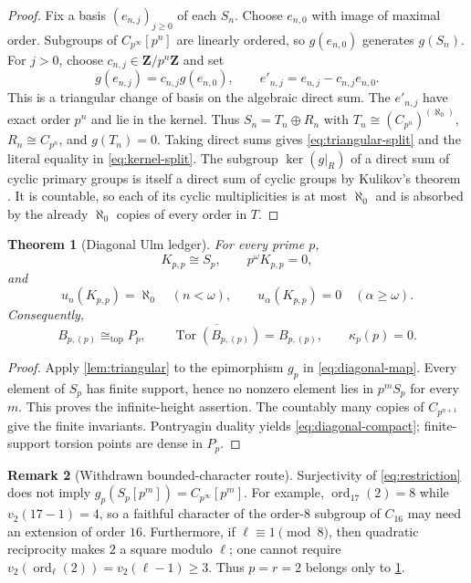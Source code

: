 \documentclass[11pt]{article}
\newtheorem{theorem}{Theorem}[section]
\theoremstyle{definition}
\newtheorem{remark}[theorem]{Remark}
\newcommand{\TopIso}{\cong_{\mathrm{top}}}
\DeclareMathOperator{\Tor}{Tor}
\DeclareMathOperator{\ord}{ord}
\begin{document}
\begin{proof}
Fix a basis $(e_{n,j})_{j\ge0}$ of each $S_n$.  Choose $e_{n,0}$ with image
of maximal order.  Subgroups of $C_{p^\infty}[p^n]$ are linearly ordered, so
$g(e_{n,0})$ generates $g(S_n)$.  For $j>0$, choose
$c_{n,j}\in\mathbf Z/p^n\mathbf Z$ and set
\[
g(e_{n,j})=c_{n,j}g(e_{n,0}),
\qquad
e'_{n,j}=e_{n,j}-c_{n,j}e_{n,0}.
\]
This is a triangular change of basis on the algebraic direct sum.  The
$e'_{n,j}$ have exact order $p^n$ and lie in the kernel.  Thus
$S_n=T_n\oplus R_n$ with
$T_n\cong(C_{p^n})^{(\aleph_0)}$, $R_n\cong C_{p^n}$, and $g(T_n)=0$.
Taking direct sums gives \eqref{eq:triangular-split} and the literal equality
in \eqref{eq:kernel-split}.  The subgroup $\ker(g|_R)$ of a direct sum of
cyclic primary groups is itself a direct sum of cyclic groups by Kulikov's
theorem \citep[Corollary~2, pp.~66--67]{Hill1972}.  It is countable, so each
of its cyclic multiplicities is at most $\aleph_0$ and is absorbed by the
already $\aleph_0$ copies of every order in $T$.
\end{proof}

\begin{theorem}[Diagonal Ulm ledger]\label{thm:diagonal-ledger}
For every prime $p$,
\begin{equation}\label{eq:diagonal-K}
K_{p,p}\cong S_p,
\qquad p^\omega K_{p,p}=0,
\end{equation}
and
\begin{equation}\label{eq:diagonal-ulm}
u_n(K_{p,p})=\aleph_0\quad(n<\omega),
\qquad
u_\alpha(K_{p,p})=0\quad(\alpha\ge\omega).
\end{equation}
Consequently,
\begin{equation}\label{eq:diagonal-compact}
B_{p,(p)}\TopIso P_p,
\qquad
\overline{\Tor(B_{p,(p)})}=B_{p,(p)},
\qquad
\kappa_p(p)=0.
\end{equation}
\end{theorem}

\begin{proof}
Apply \cref{lem:triangular} to the epimorphism $g_p$ in
\eqref{eq:diagonal-map}.  Every element of $S_p$ has finite support, hence no
nonzero element lies in $p^mS_p$ for every $m$.  This proves the
infinite-height assertion.  The countably many copies of $C_{p^{n+1}}$ give
the finite invariants.  Pontryagin duality yields
\eqref{eq:diagonal-compact}; finite-support torsion points are dense in $P_p$.
\end{proof}

\begin{remark}[Withdrawn bounded-character route]\label{rem:withdrawn}
Surjectivity of \eqref{eq:restriction} does not imply
$g_p(S_p[p^m])=C_{p^\infty}[p^m]$.  For example,
$\ord_{17}(2)=8$ while $v_2(17-1)=4$, so a faithful character of the
order-$8$ subgroup of $C_{16}$ may need an extension of order $16$.
Furthermore, if $\ell\equiv1\pmod8$, then quadratic reciprocity makes $2$ a
square modulo $\ell$; one cannot require
$v_2(\ord_\ell(2))=v_2(\ell-1)\ge3$.  Thus $p=r=2$ belongs only to
\cref{thm:diagonal-ledger}.
\end{remark}
\end{document}
